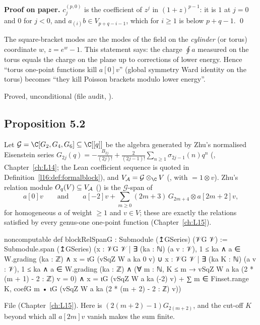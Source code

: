 \textbf{Proof on paper.} $c^{(p,0)}_j$ is the coefficient of $z^j$ in $(1+z)^{p-1}$: it is $1$ at $j=0$ and $0$ for
$j<0$, and $a_{(i)}b\in V_{p+q-i-1}$, which for $i\ge1$ is below $p+q-1$. \qed

\begin{physics}
The square-bracket modes are the modes of the field on the \emph{cylinder} (or torus) coordinate $w$, $z = e^w-1$.
This statement says: the charge $\oint a$ measured on the torus equals the charge on the plane up to corrections
of lower energy. Hence ``torus one-point functions kill $a[0]v$'' (global symmetry Ward identity on the torus)
becomes ``they kill Poisson brackets modulo lower energy''.
\end{physics}

\begin{status}
Proved, unconditional (file audit, \lean{[propext, Classical.}\allowbreak{}\allowbreak\lean{sound]}).
\end{status}

\subsection{Proposition 5.2}

Let $\mathcal G = \C[G_2,G_4,G_6]\subseteq\C[[q]]$ be the algebra generated by Zhu's normalised Eisenstein series
$G_{2j}(q) = -\frac{B_{2j}}{(2j)!} + \frac{2}{(2j-1)!}\sum_{n\ge1}\sigma_{2j-1}(n)q^n$ (, Chapter~\ref{ch:L14};
the Lean coefficient sequence  is quoted in Definition~\ref{l16:def:formalblock}), and $\lsixteenVA = \mathcal G\otimes_\C V$ (, with
 $=1\otimes v$). Zhu's relation module $O_q(V)\subseteq V_{\mathcal A}$ () is the
$\mathcal G$-span of
\begin{equation*}
a[0]v \qquad\text{and}\qquad a[-2]v + \sum_{m\ge0}(2m+3)\,G_{2m+4}\otimes a[2m+2]v ,
\end{equation*}
for homogeneous $a$ of weight $\ge1$ and $v\in V$; these are exactly the relations satisfied by every genus-one
one-point function (Chapter~\ref{ch:L15}).

\begin{leancode}
noncomputable def blockRelSpanG : Submodule (↥GSeries) (𝒱G 𝒱) :=
  Submodule.span (↥GSeries)
    ({x : 𝒱G 𝒱 | ∃ (ka : ℕ) (a v : 𝒱), 1 ≤ ka ∧ a ∈ W.grading (ka : ℤ) ∧
        x = ιG (vSqZ W a ka 0 v)} ∪
     {x : 𝒱G 𝒱 | ∃ (ka K : ℕ) (a v : 𝒱), 1 ≤ ka ∧ a ∈ W.grading (ka : ℤ) ∧
        (∀ m : ℕ, K ≤ m → vSqZ W a ka (2 * (m + 1) - 2 : ℤ) v = 0) ∧
        x = ιG (vSqZ W a ka (-2) v) + ∑ m ∈ Finset.range K,
              coefG m • ιG (vSqZ W a ka (2 * (m + 2) - 2 : ℤ) v)})
\end{leancode}
\noindent File  (Chapter~\ref{ch:L15}).
Here  is $(2(m+2)-1)G_{2(m+2)}$, and the cut-off $K$ beyond which all $a[2m]v$ vanish makes the
sum finite.

